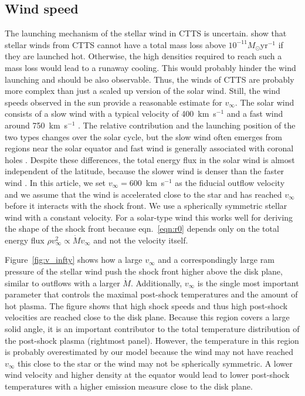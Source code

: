 \documentclass[manuscript]{aastex}
\begin{document}
\subsection{Wind speed}
The launching mechanism of the stellar wind in CTTS is uncertain. \citet{2007IAUS..243..299M} show that stellar winds from CTTS cannot have a total mass loss above $10^{-11}M_\odot\mathrm{ yr}^{-1}$ if they are launched hot. Otherwise, the high densities required to reach such a mass loss would lead to a runaway cooling. 
This would probably hinder the wind  launching and should be also observable. Thus, the winds of CTTS are probably more complex than just a scaled up version of the solar wind. Still, the wind speeds observed in the sun provide a reasonable estimate for $v_\infty$. The solar wind consists of a slow wind with a typical velocity of 400~km~s$^{-1}$ and a fast wind around 750~km~s$^{-1}$ \citep{2005JGRA..110.7109F}. The relative contribution and the launching position of the two types changes over the solar cycle, but the slow wind often emerges from regions near the solar equator and fast wind is generally associated with coronal holes \citep{1999GeoRL..26.2901G,2003A&A...408.1165B,2009LRSP....6....3C}. Despite these differences, the total energy flux in the solar wind is almost independent of the latitude, because the slower wind is denser than the faster wind \citep{2012SoPh..279..197L}. In this article, we set $v_\infty=600$~km~s$^{-1}$ as the fiducial outflow velocity and we assume that the wind is accelerated close to the star and has reached $v_\infty$ before it interacts with the shock front. We use a spherically symmetric stellar wind with a constant velocity. For a solar-type wind this works well for deriving the shape of the shock front because eqn.~\ref{eqn:r0} depends only on the total energy flux $\rho v^2_\infty \propto \dot M v_\infty$ and not the velocity itself. 

Figure~\ref{fig:v_infty} shows how a large $v_\infty$ and a correspondingly large ram pressure of the stellar wind push the shock front higher above the disk plane, similar to outflows with a larger $\dot M$. Additionally, $v_\infty$ is the single most important parameter that controls the maximal post-shock temperatures and the amount of hot plasma.
The figure shows that high shock speeds and thus high post-shock velocities are reached close to the disk plane. Because this region covers a large solid angle, it is an important contributor to the total temperature distribution of the post-shock plasma (rightmost panel). However, the temperature in this region is probably overestimated by our model because the wind may not have reached $v_\infty$ this close to the star or the wind may not be spherically symmetric. A lower wind velocity and higher density at the equator would lead to lower post-shock temperatures with a higher emission measure close to the disk plane.
\end{document}

